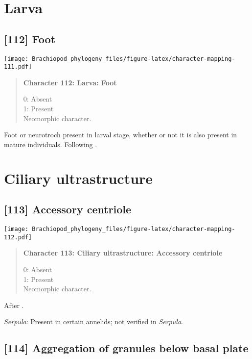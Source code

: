 \documentclass[openany]{book}
\theoremstyle{definition}
\theoremstyle{definition}
\theoremstyle{definition}
\theoremstyle{remark}
\begin{document}
\section{Larva}\label{larva-1}

\subsection*{{[}112{]} Foot}\label{foot}

\texttt{[image: Brachiopod\_phylogeny\_files/figure-latex/character-mapping-111.pdf]}

\begin{quote}
\textbf{Character 112: Larva: Foot}

0: Absent\\
1: Present\\
Neomorphic character.
\end{quote}

Foot or neurotroch present in larval stage, whether or not it is also
present in mature individuals. Following \citet{Wingstrand1985}.

\section{Ciliary ultrastructure}\label{ciliary-ultrastructure}

\subsection*{{[}113{]} Accessory centriole}\label{accessory-centriole}

\texttt{[image: Brachiopod\_phylogeny\_files/figure-latex/character-mapping-112.pdf]}

\begin{quote}
\textbf{Character 113: Ciliary ultrastructure: Accessory centriole}

0: Absent\\
1: Present\\
Neomorphic character.
\end{quote}

After \citet{Lundin2009}.

\hypertarget{Serpula-coding-113}{}
\emph{Serpula}: Present in certain annelids; not verified in
\emph{Serpula}.

\subsection*{{[}114{]} Aggregation of granules below basal
plate}\label{aggregation-of-granules-below-basal-plate}
\end{document}
